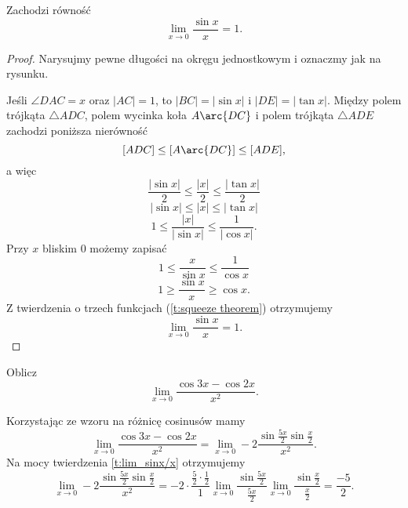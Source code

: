 \begin{theorem}
    \label{t:lim_sinx/x}
    Zachodzi równość
    \[ \lim_{x \to 0}\frac{\sin{x}}{x} = 1. \]
\end{theorem}
\begin{proof}
    Narysujmy pewne długości na okręgu jednostkowym i oznaczmy jak na rysunku.
    \begin{center}
    \end{center}
    Jeśli $\angle DAC = x$ oraz $|AC| = 1$, to $|BC| = |\sin x|$ i $|DE| = |\tan x|$. Między polem trójkąta $\triangle ADC$, polem wycinka koła $A\arc{DC}$ i polem trójkąta $\triangle ADE$ zachodzi poniższa nierówność
    \[ [ADC] \leq [A\arc{DC}] \leq [ADE], \]
    a więc
    \[ \frac{|\sin x|}{2} \leq \frac{|x|}{2} \leq \frac{|\tan x|}{2} \]
    \[ |\sin x| \leq |x| \leq |\tan x| \]
    \[ 1 \leq \frac{|x|}{|\sin{x}|} \leq \frac{1}{|\cos x|}. \]
    Przy $x$ bliskim $0$ możemy zapisać
    \[ 1 \leq \frac{x}{\sin{x}} \leq \frac{1}{\cos x} \]
    \[ 1 \geq \frac{\sin{x}}{x} \geq \cos x. \]
    Z twierdzenia o trzech funkcjach (\ref{t:squeeze theorem}) otrzymujemy
    \[ \lim_{x \to 0} \frac{\sin{x}}{x} = 1. \]
\end{proof}

\begin{example}
    Oblicz
    \[ \lim_{x \to 0} \frac{\cos{3x} - \cos{2x}}{x^2}. \]
\end{example}
\begin{solution}
    Korzystając ze wzoru na różnicę cosinusów mamy
    \[ \lim_{x \to 0} \frac{\cos{3x} - \cos{2x}}{x^2} = \lim_{x \to 0} -2\frac{\sin\frac{5x}{2}\sin\frac{x}{2}}{x^2}. \]
    Na mocy twierdzenia \ref{t:lim_sinx/x} otrzymujemy
    \[ \lim_{x \to 0} -2\frac{\sin\frac{5x}{2}\sin\frac{x}{2}}{x^2} = -2\cdot\frac{\frac{5}{2}\cdot\frac{1}{2}}{1}\lim_{x\to 0}\frac{\sin\frac{5x}{2}}{\frac{5x}{2}}\lim_{x\to 0}\frac{\sin\frac{x}{2}}{\frac{x}{2}} =  \frac{-5}{2}. \]
\end{solution}

